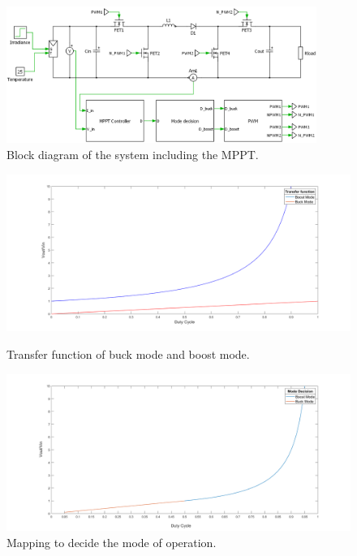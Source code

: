 \begin{figure}[H]
	\begin{center}
		\includegraphics[width=0.9\textwidth]{../Pictures/BD_implementation_POalgorithm}
		\caption{Block diagram of the system including the MPPT.}
		\label{BD_POalgorithm}
	\end{center}	
\end{figure}


\begin{figure}[H]
	\begin{minipage}[b]{0.8\linewidth}
		\centering
		\includegraphics[width=\textwidth]{../Pictures/transfer_function_buck_boost_mode}
		\caption{Transfer function of buck mode and boost mode.}
		\label{fig:tfmodes}
	\end{minipage}
	\hspace{0.5cm}
	\begin{minipage}[b]{0.8\linewidth}
		\centering
		\includegraphics[width=\textwidth]{../Pictures/Mode_decision_duty_vs_gain}
		\caption{Mapping to decide the mode of operation.}
		\label{fig:modedecisionmapping}
	\end{minipage}
\end{figure}


